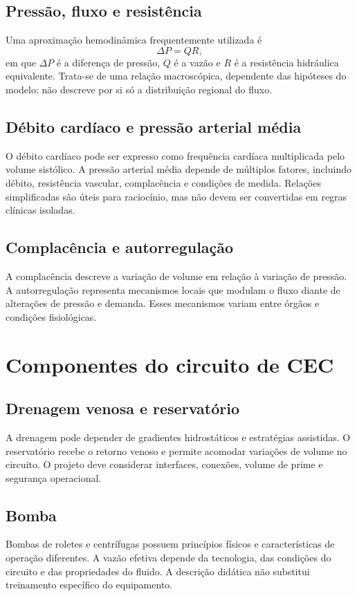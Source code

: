 \documentclass[11pt,a4paper,oneside]{book}
\begin{document}
\section{Pressão, fluxo e resistência}
Uma aproximação hemodinâmica frequentemente utilizada é
\[
\Delta P=QR,
\]
em que $\Delta P$ é a diferença de pressão, $Q$ é a vazão e $R$ é a resistência hidráulica equivalente. Trata-se de uma relação macroscópica, dependente das hipóteses do modelo; não descreve por si só a distribuição regional do fluxo.

\section{Débito cardíaco e pressão arterial média}
O débito cardíaco pode ser expresso como frequência cardíaca multiplicada pelo volume sistólico. A pressão arterial média depende de múltiplos fatores, incluindo débito, resistência vascular, complacência e condições de medida. Relações simplificadas são úteis para raciocínio, mas não devem ser convertidas em regras clínicas isoladas.

\section{Complacência e autorregulação}
A complacência descreve a variação de volume em relação à variação de pressão. A autorregulação representa mecanismos locais que modulam o fluxo diante de alterações de pressão e demanda. Esses mecanismos variam entre órgãos e condições fisiológicas.

\chapter{Componentes do circuito de CEC}
\section{Drenagem venosa e reservatório}
A drenagem pode depender de gradientes hidrostáticos e estratégias assistidas. O reservatório recebe o retorno venoso e permite acomodar variações de volume no circuito. O projeto deve considerar interfaces, conexões, volume de prime e segurança operacional.

\section{Bomba}
Bombas de roletes e centrífugas possuem princípios físicos e características de operação diferentes. A vazão efetiva depende da tecnologia, das condições do circuito e das propriedades do fluido. A descrição didática não substitui treinamento específico do equipamento.
\end{document}
